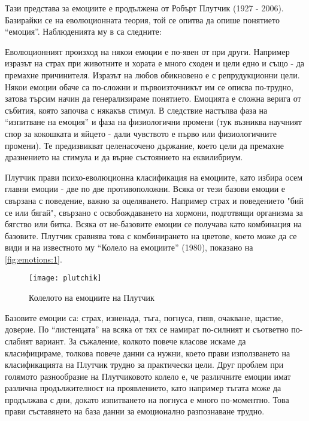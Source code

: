 \documentclass[main.tex]{subfiles}
\begin{document}
Тази представа за емоциите е продължена от Робърт Плутчик (1927 - 2006). Базирайки се на еволюционната теория, той се опитва да опише понятието ``емоция''. Наблюденията му в \cite{plut} са следните:

Еволюционният произход на някои емоции е по-явен от при други. Например изразът на страх при животните и хората е много сходен и цели едно и също - да премахне причинителя. Изразът на любов обикновено е с репрудукционни цели. Някои емоции обаче са по-сложни и първоизточникът им се описва по-трудно, затова търсим начин да генерализираме понятието. Емоцията е сложна верига от събития, която започва с някакъв стимул. В следствие настъпва фаза на ``изпитване на емоция'' и фаза на физиологични промени (тук възниква научният спор за кокошката и яйцето - дали чувството е първо или физиологичните промени). Те предизвикват целенасочено държание, което цели да премахне дразнението на стимула и да върне състоянието на еквилибриум. 

Плутчик прави психо-еволюционна класификация на емоциите, като избира осем главни емоции - две по две противоположни. Всяка от тези базови емоции е свързана с поведение, важно за оцеляването. Например страх и поведението "бий се или бягай", свързано с освобождаването на хормони, подготвящи организма за бягство или битка. Всяка от не-базовите емоции се получава като комбинация на базовите. Плутчик сравнява това с комбинирането на цветове, което може да се види и на известното му ``Колело на емоциите'' (1980), показано на \autoref{fig:emotions:1}.

\begin{minipage}{0.45\textwidth}
    \begin{figure}[H]%
        \texttt{[image: plutchik]}
        \caption{Колелото на емоциите на Плутчик}
        \label{fig:emotions:1}
    \end{figure}
\end{minipage} \hfill
\begin{minipage}{0.45\textwidth}
    Базовите емоции са: страх, изненада, тъга, погнуса, гняв, очакване, щастие, доверие. По ``листенцата'' на всяка от тях се намират по-силният и съответно по-слабият вариант. За съжаление, колкото повече класове искаме да класифицираме, толкова повече данни са нужни, което прави използването на класификацията на Плутчик трудно за практически цели. Друг проблем при голямото разнообразие на Плутчиковото колело е, че различните емоции имат различна продължителност на проявлението, като например тъгата може да продължава с дни, докато изпитването на погнуса е много по-моментно. Това прави съставянето на база данни за емоционално разпознаване трудно.
\end{minipage}
\end{document}

